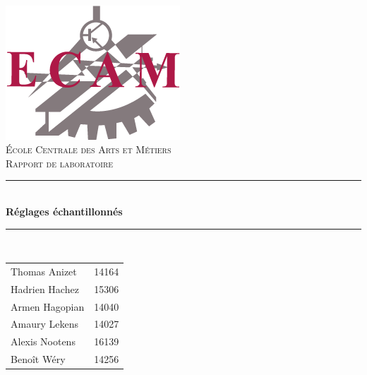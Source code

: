 \setlength{\parindent}{0cm}
\setlength{\parskip}{1ex plus 0.5ex minus 0.2ex}
\newcommand{\hsp}{\hspace{20pt}}
\newcommand{\HRule}{\rule{\linewidth}{0.5mm}}

\begin{titlepage}
  \begin{sffamily}
  \begin{center}

	\hsp\\[2cm]
	\includegraphics[scale=0.6]{page-garde/ecam-logo}~\\[1.5cm]
   \textsc{\LARGE École Centrale des Arts et Métiers}\\[2.5cm]

    \textsc{\Large Rapport de laboratoire}\\[2cm]
%
    \HRule \\[0.4cm]
    { \huge \bfseries Réglages échantillonnés\\[0.4cm] }

    \HRule \\[1cm]

    \begin{minipage}{0.4\textwidth}
      \begin{flushleft} \large
      \begin{tabular}{ll}
        Thomas  Anizet   & 14164 \\
        Hadrien Hachez   & 15306 \\
        Armen   Hagopian & 14040 \\
        Amaury  Lekens   & 14027 \\
        Alexis  Nootens  & 16139 \\
        Benoît  Wéry     & 14256 \\
      \end{tabular}
        

\end{flushleft}
\end{minipage}
\end{center}
\end{sffamily}
\end{titlepage}
